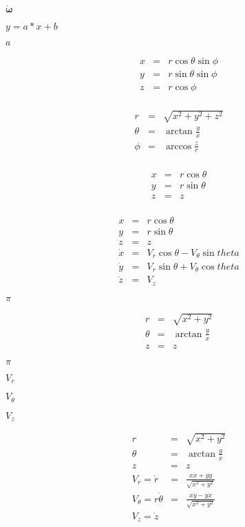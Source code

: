 \documentclass{article}
\begin{document}
$\dot{\boldsymbol{\omega}}$
\pagebreak

$y=a*x+b$
\pagebreak

$a$
\pagebreak

\begin{eqnarray*} x &=& r\cos\theta\sin\phi \\ y &=& r\sin\theta\sin\phi \\ z &=& r\cos\phi \\ \end{eqnarray*}
\pagebreak

\begin{eqnarray*} r &=& \sqrt{ x^{ 2 } + y^{ 2 } + z^{ 2 } } \\ \theta &=& \arctan\frac{ y }{ x } \\ \phi &=& \arccos\frac{ z }{ r } \\ \end{eqnarray*}
\pagebreak

\begin{eqnarray*} x &=& r\cos \theta \\ y &=& r\sin \theta \\ z &=& z \\ \end{eqnarray*}
\pagebreak

\begin{eqnarray*} x &=& r\cos \theta \\ y &=& r\sin \theta \\ z &=& z \\ \dot{x} &=& V_r\cos{\theta} - V_{\theta}\sin{theta} \\ \dot{y} &=& V_r\sin{\theta} + V_{\theta}\cos{theta} \\ \dot{z} &=& V_z \end{eqnarray*}
\pagebreak

$ \pi $
\pagebreak

\begin{eqnarray*} r &=& \sqrt{x^2+y^2} \\ \theta &=& \arctan{\frac{y}{x}} \\ z &=& z \end{eqnarray*}
\pagebreak

$\pi$
\pagebreak

$ V_r $
\pagebreak

$ V_{\theta} $
\pagebreak

$ V_z $
\pagebreak

\begin{eqnarray*} r &=& \sqrt{x^2+y^2} \\ \theta &=& \arctan{\frac{y}{x}} \\ z &=& z \\ V_r = \dot{r} &=& \frac{x\dot{x}+y\dot{y}}{\sqrt{x^2+y^2}} \\ V_{\theta} = r\dot{\theta} &=& \frac{x\dot{y}-y\dot{x}}{\sqrt{x^2+y^2}} \\ V_z = \dot{z} \end{eqnarray*}
\pagebreak
\end{document}
